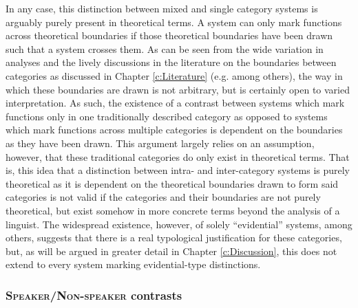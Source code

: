 In any case, this distinction between mixed and single category systems is arguably purely present in theoretical terms. A system can only mark functions across theoretical boundaries if those theoretical boundaries have been drawn such that a system crosses them. As can be seen from the wide variation in analyses and the lively discussions in the literature on the boundaries between categories as discussed in Chapter \ref{c:Literature} (e.g.  among others), the way in which these boundaries are drawn is not arbitrary, but is certainly open to varied interpretation. As such, the existence of a contrast between systems which mark functions only in one traditionally described category as opposed to systems which mark functions across multiple categories is dependent on the boundaries as they have been drawn. This argument largely relies on an assumption, however, that these traditional categories do only exist in theoretical terms. That is, this idea that a distinction between intra- and inter-category systems is purely theoretical as it is dependent on the theoretical boundaries drawn to form said categories is not valid if the categories and their boundaries are not purely theoretical, but exist somehow in more concrete terms beyond the analysis of a linguist. The widespread existence, however, of solely ``evidential'' systems, among others, suggests that there is a real typological justification for these categories, but, as will be argued in greater detail in Chapter \ref{c:Discussion}, this does not extend to every system marking evidential-type distinctions.




\subsubsection{\textsc{Speaker}/\textsc{Non-speaker} contrasts}\label{sss:Description:SpeakerNonSpeaker}

